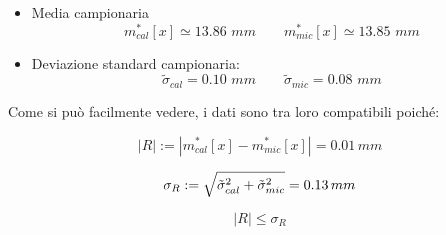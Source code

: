 \begin{itemize}
    \item{Media campionaria}
    \begin{equation*}
        m^*_{cal}[x] \simeq 13.86\,\,mm \qquad
        m^*_{mic}[x] \simeq 13.85\,\,mm 
    \end{equation*}

    \item{Deviazione standard campionaria:}
    \begin{equation*}
        \tilde{\sigma}_{cal} = 0.10\,\,mm \qquad
        \tilde{\sigma}_{mic} = 0.08\,\,mm
    \end{equation*}
\end{itemize}

Come si può facilmente vedere, i dati sono tra loro compatibili poiché:

\begin{equation*}
    |R| := |m^*_{cal}[x] - m^*_{mic}[x]| = 0.01 \, mm
\end{equation*}

\begin{equation*}
    \sigma_{R} := \sqrt{\tilde{\sigma}_{cal}^2 + \tilde{\sigma}_{mic}^2} = 0.13 \, mm \\
\end{equation*}


\begin{equation*}
    |R| \leq \sigma_{R}
\end{equation*}
